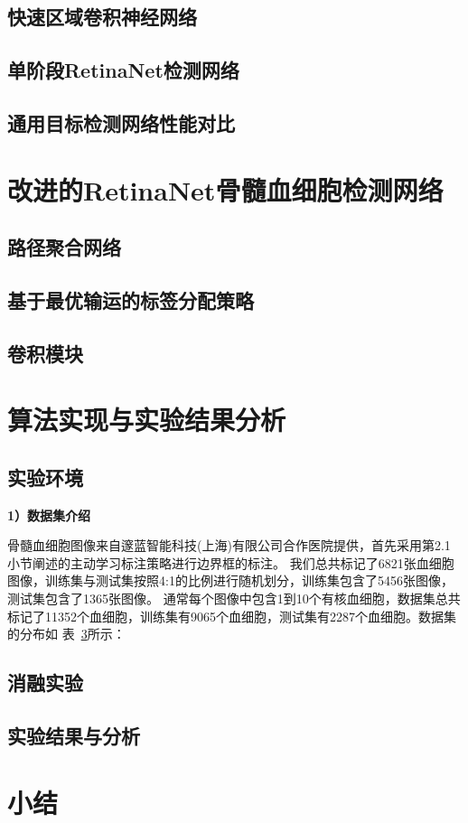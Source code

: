 \subsection{快速区域卷积神经网络}
\subsection{单阶段RetinaNet检测网络}
\subsection{通用目标检测网络性能对比}

\section{改进的RetinaNet骨髓血细胞检测网络}
\subsection{路径聚合网络}
\subsection{基于最优输运的标签分配策略}
\subsection{卷积模块}
\section{算法实现与实验结果分析}
\subsection{实验环境}

\textbf{1）数据集介绍}

骨髓血细胞图像来自邃蓝智能科技(上海)有限公司合作医院提供，首先采用第2.1小节阐述的主动学习标注策略进行边界框的标注。
我们总共标记了6821张血细胞图像，训练集与测试集按照4:1的比例进行随机划分，训练集包含了5456张图像，测试集包含了1365张图像。
通常每个图像中包含1到10个有核血细胞，数据集总共标记了11352个血细胞，训练集有9065个血细胞，测试集有2287个血细胞。数据集的分布如
表~\ref{}所示：




\subsection{消融实验}
\subsection{实验结果与分析}
\section{小结}


